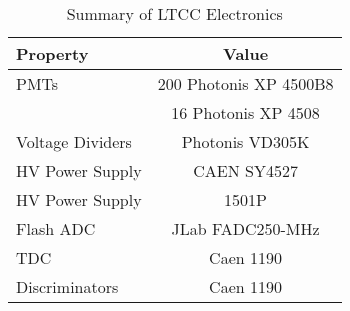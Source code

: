 \begin{table}[h]
	\begin{center}
		\begin{tabular}{| l | c |}
			\hline \hline
			Property                 & Value \\
			\hline
			PMTs             & 200 Photonis XP 4500B8    \\
	                       & 16 Photonis XP 4508       \\
			Voltage Dividers & Photonis VD305K           \\
			HV Power Supply  & CAEN SY4527               \\
			HV Power Supply  & 1501P                     \\
			Flash ADC        & JLab FADC250-MHz          \\
			TDC              & Caen 1190                 \\
			Discriminators   & Caen 1190                 \\
			\hline \hline
		\end{tabular}
	\end{center}
	\caption{Summary of LTCC Electronics}\label{tab:ltccChannels}
\end{table}

